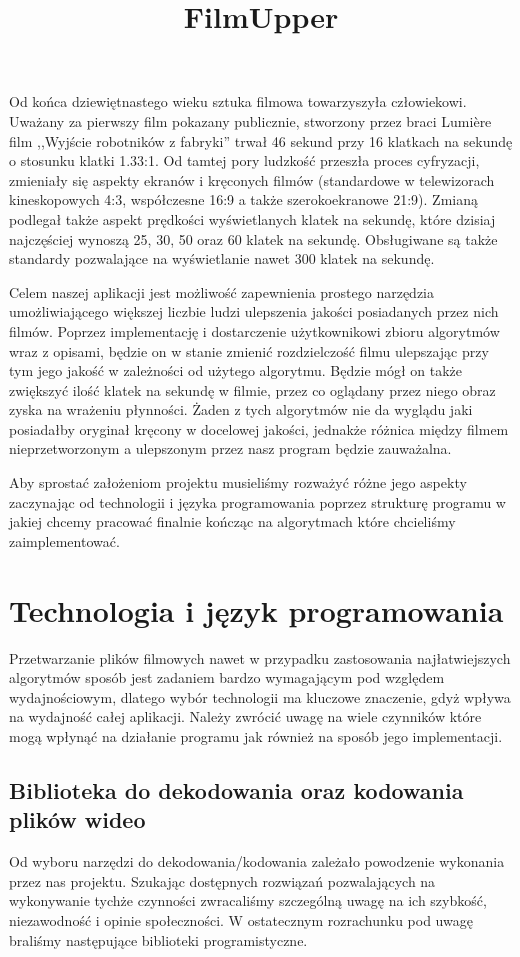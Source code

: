 \documentclass[twoside]{projektInzynierskiMS}
\title{FilmUpper}
\begin{document}
Od końca dziewiętnastego wieku sztuka filmowa towarzyszyła człowiekowi. Uważany za pierwszy film pokazany publicznie, stworzony przez braci Lumière  film ,,Wyjście robotników z fabryki'' trwał 46 sekund przy 16 klatkach na sekundę o stosunku klatki 1.33:1. Od tamtej pory ludzkość przeszła proces cyfryzacji, zmieniały się aspekty ekranów i kręconych filmów (standardowe w telewizorach kineskopowych 4:3, współczesne 16:9 a także szerokoekranowe 21:9). Zmianą podlegał także aspekt prędkości wyświetlanych klatek na sekundę, które dzisiaj najczęściej wynoszą 25, 30, 50 oraz 60 klatek na sekundę. Obsługiwane są także standardy pozwalające na wyświetlanie nawet 300 klatek na sekundę.

Celem naszej aplikacji jest możliwość zapewnienia prostego narzędzia umożliwiającego większej liczbie ludzi ulepszenia jakości posiadanych przez nich filmów. Poprzez implementację i dostarczenie użytkownikowi zbioru algorytmów wraz z opisami, będzie on w stanie zmienić rozdzielczość filmu ulepszając przy tym jego jakość w zależności od użytego algorytmu. Będzie mógł on także zwiększyć ilość klatek na sekundę w filmie, przez co oglądany przez niego obraz zyska na wrażeniu płynności. Żaden z tych algorytmów nie da wyglądu jaki posiadałby oryginał kręcony w docelowej jakości, jednakże różnica między filmem nieprzetworzonym a ulepszonym przez nasz program będzie zauważalna.

Aby sprostać założeniom projektu musieliśmy rozważyć różne jego aspekty zaczynając od technologii i języka programowania poprzez strukturę programu w jakiej chcemy pracować finalnie kończąc na algorytmach które chcieliśmy zaimplementować.


\section{Technologia i język programowania}


Przetwarzanie plików filmowych nawet w przypadku zastosowania najłatwiejszych algorytmów sposób jest zadaniem bardzo wymagającym pod względem wydajnościowym, dlatego wybór technologii ma kluczowe znaczenie, gdyż wpływa na wydajność całej aplikacji. Należy zwrócić uwagę na wiele czynników które mogą wpłynąć na działanie programu jak również na sposób jego implementacji.

\subsection{Biblioteka do dekodowania oraz kodowania plików wideo}
Od wyboru narzędzi do dekodowania/kodowania zależało powodzenie wykonania przez nas projektu. Szukając dostępnych rozwiązań pozwalających na wykonywanie tychże czynności zwracaliśmy szczególną uwagę na ich szybkość, niezawodność i opinie społeczności. W ostatecznym rozrachunku pod uwagę braliśmy następujące biblioteki programistyczne.
\end{document}
